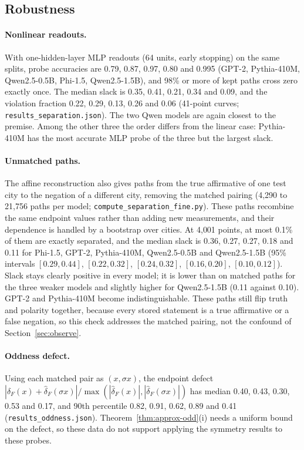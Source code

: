 \documentclass[10pt]{article}
\theoremstyle{definition}
\theoremstyle{remark}
\newcommand{\dFhat}{\hat\delta_{\!F}}
\begin{document}
\subsection{Robustness}
\label{sec:robust}

\paragraph{Nonlinear readouts.}
With one-hidden-layer MLP readouts (64 units, early stopping) on the same
splits, probe accuracies are 0.79, 0.87, 0.97, 0.80 and 0.995 (GPT-2,
Pythia-410M, Qwen2.5-0.5B, Phi-1.5, Qwen2.5-1.5B), and 98\% or more of
kept paths cross zero exactly once. The median slack is 0.35, 0.41, 0.21,
0.34 and 0.09, and the violation fraction 0.22, 0.29, 0.13, 0.26 and 0.06
(41-point curves; \texttt{results\_separation.json}). The two Qwen models
are again closest to the premise. Among the other three the order differs from the
linear case: Pythia-410M has the most accurate MLP probe of the three but
the largest slack.

\paragraph{Unmatched paths.}
The affine reconstruction also gives paths from the true affirmative of
one test city to the negation of a different city, removing the matched
pairing (4{,}290 to 21{,}756 paths per model;
\texttt{compute\_separation\_fine.py}). These paths recombine the same
endpoint values rather than adding new measurements, and their dependence
is handled by a bootstrap over cities. At 4{,}001 points, at most 0.1\% of
them are exactly separated, and the median slack is 0.36, 0.27, 0.27, 0.18
and 0.11 for Phi-1.5, GPT-2, Pythia-410M, Qwen2.5-0.5B and Qwen2.5-1.5B
(95\% intervals $[0.29,0.44]$, $[0.22,0.32]$, $[0.24,0.32]$,
$[0.16,0.20]$, $[0.10,0.12]$). Slack stays clearly positive in every model;
it is lower than on matched paths for the three weaker models and slightly
higher for Qwen2.5-1.5B (0.11 against 0.10). GPT-2 and Pythia-410M become
indistinguishable. These paths still flip truth and polarity together,
because every stored statement is a true affirmative or a false negation,
so this check addresses the matched pairing, not the confound of
Section~\ref{sec:observe}.

\paragraph{Oddness defect.}
Using each matched pair as $(x,\sigma x)$, the endpoint defect
$|\dFhat(x)+\dFhat(\sigma x)|/\max(|\dFhat(x)|,|\dFhat(\sigma x)|)$ has median 0.40,
0.43, 0.30, 0.53 and 0.17, and 90th percentile 0.82, 0.91, 0.62, 0.89 and
0.41 (\texttt{results\_oddness.json}). Theorem~\ref{thm:approx-odd}(i)
needs a uniform bound on the defect, so these data do not support applying
the symmetry results to these probes.
\end{document}
